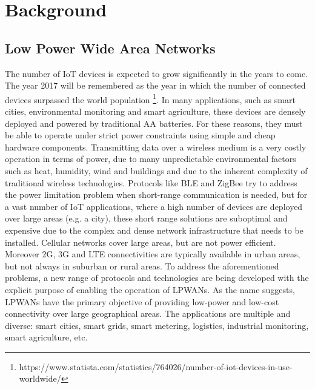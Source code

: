 
\chapter{Background}
\label{chapter:background}


\section{Low Power Wide Area Networks}

The number of \gls{IoT} devices is expected to grow significantly in the years to come. The year 2017 will be remembered as the year in which the number of connected devices surpassed the world population \footnote{https://www.statista.com/statistics/764026/number-of-iot-devices-in-use-worldwide/}.
In many applications, such as smart cities, environmental monitoring and smart agriculture, these devices are densely deployed and powered by traditional AA batteries. For these reasons, they must be able to operate under strict power constraints using simple and cheap hardware components. Transmitting data over a wireless medium is a very costly operation in terms of power, due to many unpredictable environmental factors such as heat, humidity, wind and buildings and due to the inherent complexity of traditional wireless technologies.
Protocols like \gls{BLE} and ZigBee try to address the power limitation problem when short-range communication is needed, but for a vast number of IoT applications, where a high number of devices are deployed over large areas (e.g. a city), these short range solutions are suboptimal and expensive due to the complex and dense network infrastructure that needs to be installed. Cellular networks cover large areas, but are not power efficient. Moreover 2G, 3G and LTE connectivities are typically available in urban areas, but not always in suburban or rural areas. To address the aforementioned problems, a new range of protocols and technologies are being developed with the explicit purpose of enabling the operation of \glspl{LPWAN}. As the name suggests, \glspl{LPWAN} have the primary objective of providing low-power and low-cost connectivity over large geographical areas. The applications are multiple and diverse: smart cities, smart grids, smart metering, logistics, industrial monitoring, smart agriculture, etc.
